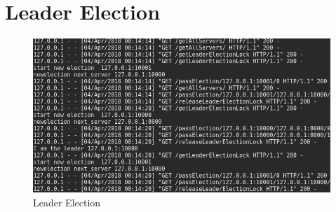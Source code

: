\documentclass{article}
\begin{document}
\section{Leader Election}
\begin{figure}[H]
        \centering
        \includegraphics[width=\textwidth]{outputs/leader_election.png}
        \caption{Leader Election}
\end{figure}
\end{document}
